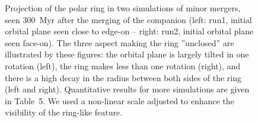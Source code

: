 \documentclass[]{aa}
\begin{document}
\begin{figure}
\centerline{}
\caption{Projection of the polar ring in two simulations of minor mergers, 
seen 300~Myr after the merging of the companion (left: run1, initial orbital 
plane seen close to edge-on -- right: run2, initial orbital plane seen face-on). 
The three aspect making the ring ''unclosed'' are illustrated by these figures: 
the orbital plane is largely tilted in one rotation (left), the ring makes less 
than one rotation (right), and there is a high decay in the radius between 
both sides of the ring (left and right). Quantitative results for more simulations 
are given in Table~5. We used a non-linear scale adjusted to enhance the visibility 
of the ring-like feature.}
\label{fig8}
\end{figure}
\end{document}
